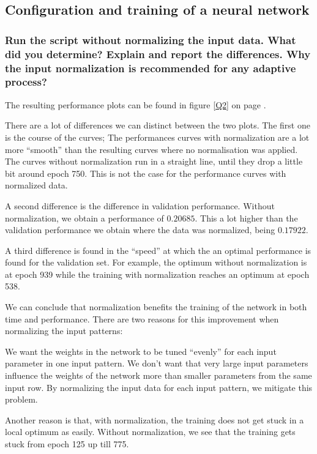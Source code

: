 \documentclass[12pt, a4paper]{article}
\begin{document}
\subsection*{Configuration and training of a neural network}
\setcounter{subsubsection}{1}
\subsubsection{Run the script without normalizing the input data. What did you determine? Explain and report the differences. Why the input normalization is recommended for any adaptive process?}
The resulting performance plots can be found in figure \ref{Q2} on page \pageref{Q2}.

There are a lot of differences we can distinct between the two plots. The first one is the course of the curves; The performances curves with normalization are a lot more ``smooth'' than the resulting curves where no normalisation was applied. The curves without normalization run in a straight line, until they drop a little bit around epoch 750. This is not the case for the performance curves with normalized data.

A second difference is the difference in validation performance. Without normalization, we obtain a performance of $0.20685$. This a lot higher than the validation performance we obtain where the data was normalized, being $0.17922$.

A third difference is found in the ``speed'' at which the an optimal performance is found for the validation set. For example, the optimum without normalization is at epoch 939 while the training with normalization reaches an optimum at epoch 538.

We can conclude that normalization benefits the training of the network in both time and performance. There are two reasons for this improvement when normalizing the input patterns:

We want the weights in the network to be tuned ``evenly'' for each input parameter in one input pattern. We don't want that very large input parameters influence the weights of the network more than smaller parameters from the same input row. By normalizing the input data for each input pattern, we mitigate this problem. 

Another reason is that, with normalization, the training does not get stuck in a local optimum as easily. Without normalization, we see that the training gets stuck from epoch 125 up till 775.
\end{document}

